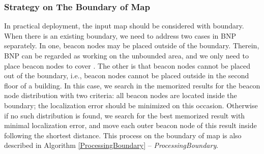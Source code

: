 \documentclass[10pt, conference, letterpaper]{IEEEtran}
\begin{document}
\subsubsection{Strategy on The Boundary of Map}
In practical deployment, the input map  should be considered with boundary. When there is an existing boundary, we need to address two cases in BNP separately. In one, beacon nodes may be placed outside of the boundary. Therein, BNP can be regarded as working on the unbounded area, and we only need to place beacon nodes to cover . The other is that beacon nodes cannot be placed out of the boundary, i.e., beacon nodes cannot be placed outside in the second floor of a building. In this case, we search in the memorized results for the beacon node distribution with two criteria: all beacon nodes are located inside the boundary; the localization error should be minimized on this occasion. Otherwise if no such distribution is found, we search for the best memorized result with minimal localization error, and move each outer beacon node of this result inside following the shortest distance. This process on the boundary of map is also described in Algorithm \ref{ProcessingBoundary} -- \textit{ProcessingBoundary}.
\end{document}
